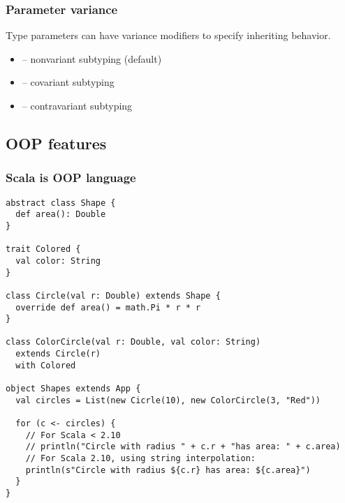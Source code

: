 \documentclass{beamer}
\begin{document}
\begin{frame}[fragile]
\frametitle{Parameter variance}
Type parameters can have variance modifiers to specify inheriting behavior.
\begin{itemize}
\item {} -- nonvariant subtyping (default)
\item {} -- covariant subtyping
\item {} -- contravariant subtyping
\end{itemize}

\end{frame}

\subsection{OOP features}

\begin{frame}[fragile]
\frametitle{Scala is OOP language}

\begin{lstlisting}
abstract class Shape {
  def area(): Double
}

trait Colored {
  val color: String
}

class Circle(val r: Double) extends Shape {
  override def area() = math.Pi * r * r
}

class ColorCircle(val r: Double, val color: String) 
  extends Circle(r) 
  with Colored

object Shapes extends App {
  val circles = List(new Cicrle(10), new ColorCircle(3, "Red"))

  for (c <- circles) {
    // For Scala < 2.10
    // println("Circle with radius " + c.r + "has area: " + c.area)
    // For Scala 2.10, using string interpolation:
    println(s"Circle with radius ${c.r} has area: ${c.area}")
  }
}

\end{lstlisting}
\end{frame}
\end{document}
